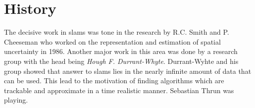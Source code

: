 \section{History}
The decisive work in \gls{slam}s was tone in the research by R.C. Smith and P. Cheeseman who worked on the representation and estimation of spatial uncertainty in 1986. Another major work in this area was done by a research group with the head being \textit{Hough F. Durrant-Whyte}. Durrant-Wyhte and his group showed that answer to \gls{slam}s lies in the nearly infinite amount of data that can be used. This lead to the motivation of finding algorithms which are trackable and approximate in a time realistic manner.\newline
Sebastian Thrun was playing.

